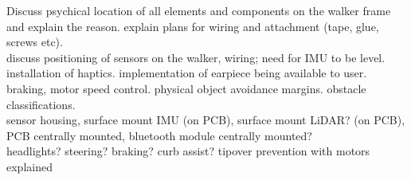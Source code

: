 \noindent Discuss psychical location of all elements and components on the walker frame and explain the reason. explain plans for wiring and attachment (tape, glue, screws etc).\\

\noindent discuss positioning of sensors on the walker, wiring; need for IMU to be level. installation of haptics. implementation of earpiece being available to user. braking, motor speed control. physical object avoidance margins. obstacle classifications.\\

\noindent sensor housing, surface mount IMU (on PCB), surface mount LiDAR? (on PCB), PCB centrally mounted, bluetooth module centrally mounted?\\

\noindent headlights? steering? braking? curb assist? tipover prevention with motors explained\\